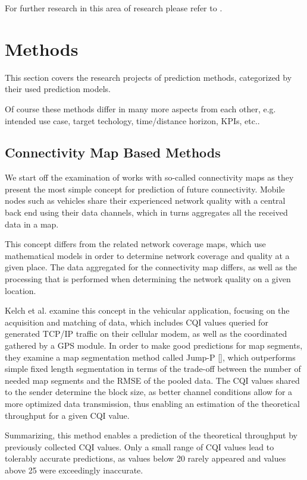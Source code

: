 \documentclass{IEEEtran}
\begin{document}
For further research in this area of research please refer to \cite{semmelrodtInvestigationDifferentFading2003,duel-hallenFadingChannelPrediction2007,wongJointChannelEstimation2005,wongWLC435LowComplexityAdaptive2006,vaughanShorttermMobileChannel2000}.


\section{Methods}
This section covers the research projects of prediction methods, categorized by their used prediction models. 

Of course these methods differ in many more aspects from each other, e.g. intended use case, target techology, time/distance horizon, KPIs, etc..


\subsection{Connectivity Map Based Methods}
We start off the examination of works with so-called connectivity maps as they present the most simple concept for prediction of future connectivity. Mobile nodes such as vehicles share their experienced network quality with a central back end using their data channels, which in turns aggregates all the received data in a map.

This concept differs from the related network coverage maps, which use mathematical models in order to determine network coverage and quality at a given place.
The data aggregated for the connectivity map differs, as well as the processing that is performed when determining the network quality on a given location.

Kelch et al. \cite{kelchCQIMapsOptimized2013} examine this concept in the vehicular application, focusing on the acquisition and matching of data, which includes CQI values queried for generated TCP/IP traffic on their cellular modem, as well as the coordinated gathered by a GPS module. In order to make good predictions for map segments, they examine a map segmentation method called Jump-P [], which outperforms simple fixed length segmentation in terms of the trade-off between the number of needed map segments and the RMSE of the pooled data. The CQI values shared to the sender determine the block size, as better channel conditions allow for a more optimized data transmission, thus enabling an estimation of the theoretical throughput for a given CQI value.

Summarizing, this method enables a prediction of the theoretical throughput by previously collected  CQI values. Only a small range of CQI values lead to tolerably accurate predictions, as values below 20 rarely appeared and values above 25 were exceedingly inaccurate.
\end{document}
